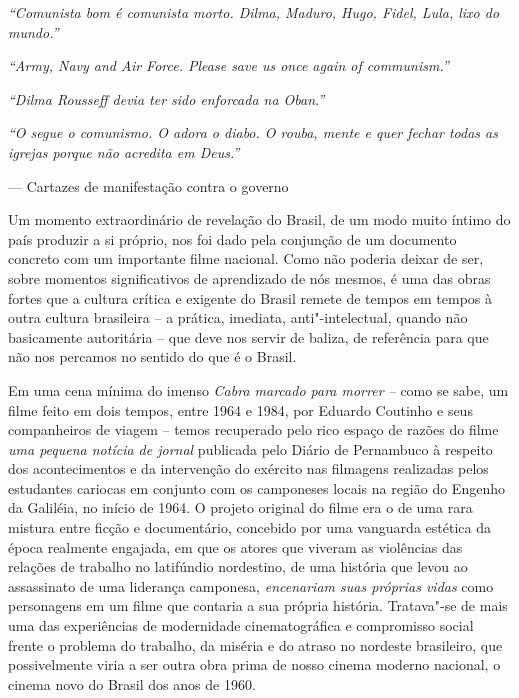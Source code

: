 
\begin{flushright}
\begin{minipage}{0.84\textwidth}
\footnotesize
\emph{``Comunista bom é comunista morto. Dilma, Maduro, Hugo, Fidel, Lula,
lixo do mundo.''}

\smallskip
\emph{``Army, Navy and Air Force. Please save us once again of communism.''}

\smallskip
\emph{``Dilma Rousseff devia ter sido enforcada na Oban.''}

\smallskip
\emph{``O  segue o comunismo. O  adora o diabo. O  rouba, mente e quer
fechar todas as igrejas porque não acredita em Deus.''}

\medskip
\hspace*{\fill}--- Cartazes de manifestação contra o governo
\end{minipage}
\end{flushright}

Um momento extraordinário de revelação do Brasil, de um modo muito
íntimo do país produzir a si próprio, nos foi dado pela conjunção de um
documento concreto com um importante filme nacional. Como não poderia
deixar de ser, sobre momentos significativos de aprendizado de nós
mesmos, é uma das obras fortes que a cultura crítica e exigente do
Brasil remete de tempos em tempos à outra cultura brasileira -- a
prática, imediata, anti"-intelectual, quando não basicamente autoritária
-- que deve nos servir de baliza, de referência para que não nos
percamos no sentido do que é o Brasil.

Em uma cena mínima do imenso \emph{Cabra marcado para morrer --} como se
sabe, um filme feito em dois tempos, entre 1964 e 1984, por Eduardo
Coutinho e seus companheiros de viagem -- temos recuperado pelo rico
espaço de razões do filme \emph{uma pequena notícia de jornal} publicada
pelo Diário de Pernambuco à respeito dos acontecimentos e da intervenção
do exército nas filmagens realizadas pelos estudantes cariocas em
conjunto com os camponeses locais na região do Engenho da Galiléia, no
início de 1964. O projeto original do filme era o de uma rara mistura
entre ficção e documentário, concebido por uma vanguarda estética da
época realmente engajada, em que os atores que viveram as violências das
relações de trabalho no latifúndio nordestino, de uma história que levou
ao assassinato de uma liderança camponesa, \emph{encenariam suas
próprias vidas} como personagens em um filme que contaria a sua própria
história. Tratava"-se de mais uma das experiências de modernidade
cinematográfica e compromisso social frente o problema do trabalho, da
miséria e do atraso no nordeste brasileiro, que possivelmente viria a
ser outra obra prima de nosso cinema moderno nacional, o cinema novo do
Brasil dos anos de 1960.

